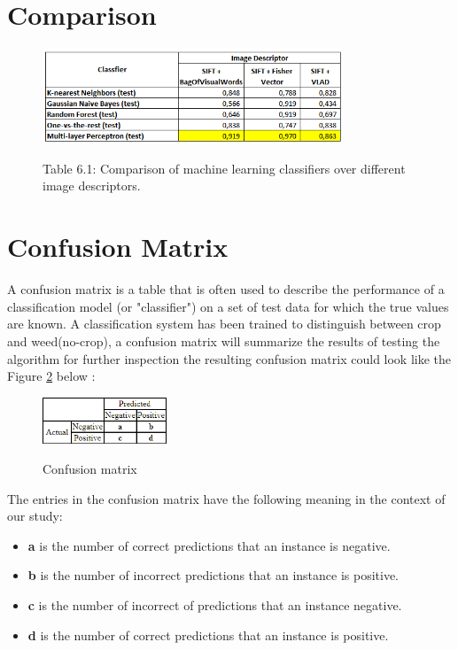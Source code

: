 \documentclass[12pt]{article}
\numberwithin{equation}{section}
\numberwithin{table}{section}
\numberwithin{figure}{section}
\begin{document}
\section{Comparison} \label{Comparison}


\begin{figure}[H] \centering
	\caption*{Table 6.1:  Comparison of machine learning classifiers over different image descriptors. }
	\includegraphics[width=0.8\textwidth]{class.png}
	\label{class}
\end{figure}


\section{Confusion Matrix} \label{cmatrix}

A confusion matrix is a table that is often used to describe the performance of a classification model (or "classifier") on a set of test data for which the true values are known.  A classification system has been trained to distinguish between crop and weed(no-crop), a confusion matrix will summarize the results of testing the algorithm for further inspection the resulting confusion matrix could look like the Figure \ref{mtx} below :

\begin{figure}[H] \centering
	\caption{Confusion matrix }
	\includegraphics[width=0.33\textwidth]{mtx.png}
	\label{mtx}
\end{figure}

The entries in the confusion matrix have the following meaning in the context of our study:

\begin{itemize}
	\item \textbf{a} is the number of correct predictions that an instance is negative.
	\item \textbf{b} is the number of incorrect predictions that an instance is positive.
	\item \textbf{c} is the number of incorrect of predictions that an instance negative.
	\item \textbf{d} is the number of correct predictions that an instance is positive.
\end{itemize}
\end{document}

